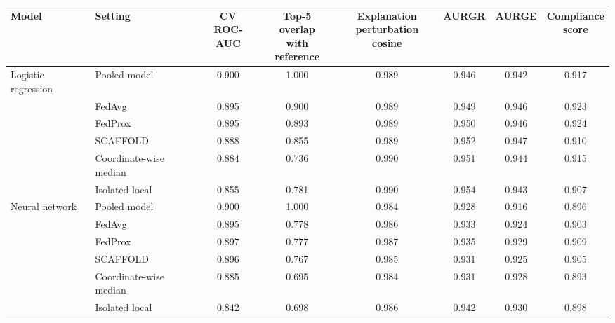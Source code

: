 \begin{tabular}{llcccccc}
\toprule
Model & Setting & \makecell{CV\\ROC-AUC} & \makecell{Top-5 overlap\\with reference} & \makecell{Explanation\\perturbation cosine} & AURGR & AURGE & \makecell{Compliance\\score} \\
\midrule
Logistic regression & Pooled model & 0.900 & 1.000 & 0.989 & 0.946 & 0.942 & 0.917 \\
 & FedAvg & 0.895 & 0.900 & 0.989 & 0.949 & 0.946 & 0.923 \\
 & FedProx & 0.895 & 0.893 & 0.989 & 0.950 & 0.946 & 0.924 \\
 & SCAFFOLD & 0.888 & 0.855 & 0.989 & 0.952 & 0.947 & 0.910 \\
 & Coordinate-wise median & 0.884 & 0.736 & 0.990 & 0.951 & 0.944 & 0.915 \\
 & Isolated local & 0.855 & 0.781 & 0.990 & 0.954 & 0.943 & 0.907 \\
\midrule
Neural network & Pooled model & 0.900 & 1.000 & 0.984 & 0.928 & 0.916 & 0.896 \\
 & FedAvg & 0.895 & 0.778 & 0.986 & 0.933 & 0.924 & 0.903 \\
 & FedProx & 0.897 & 0.777 & 0.987 & 0.935 & 0.929 & 0.909 \\
 & SCAFFOLD & 0.896 & 0.767 & 0.985 & 0.931 & 0.925 & 0.905 \\
 & Coordinate-wise median & 0.885 & 0.695 & 0.984 & 0.931 & 0.928 & 0.893 \\
 & Isolated local & 0.842 & 0.698 & 0.986 & 0.942 & 0.930 & 0.898 \\
\bottomrule
\end{tabular}
